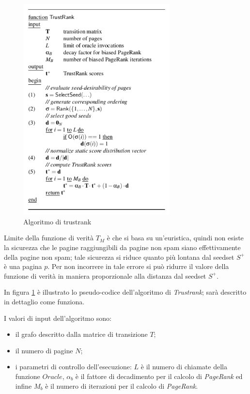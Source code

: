 \begin{figure}
\centering
\includegraphics[width=8cm]{immagini/trustrank/trustrank}
\caption{Algoritmo di trustrank}
\label{fig:trustrank1}
\end{figure}
Limite della funzione di verità \(T_M\) è che si basa su un'euristica, quindi non esiste la sicurezza che le pagine raggiungibili da pagine non spam siano effettivamente della pagine non spam; tale sicurezza si riduce quanto più lontana dal seedset \(S^+\) è una pagina \(p\). Per non incorrere in tale errore si può ridurre il valore della funzione di verità in maniera proporzionale alla distanza dal seedset \(S^+\).

In figura \ref{fig:trustrank1} è illustrato lo pseudo-codice dell'algoritmo di \textit{Trustrank}; sarà descritto in dettaglio come funziona. 

I valori di input dell'algoritmo sono:
\begin{itemize}
 \item il grafo descritto dalla matrice di transizione \(T\);
 \item il numero di pagine \(N\);
 \item i parametri di controllo dell'esecuzione: \(L\) è il numero di chiamate della funzione \(Oracle\), \(\alpha_b\) è il fattore di decadimento per il calcolo di \textit{PageRank} ed infine \(M_b\) è il numero di iterazioni per il calcolo di \textit{PageRank}.
\end{itemize}

